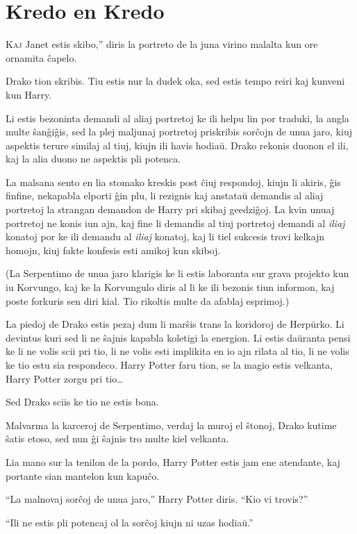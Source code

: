 \chapter{Kredo en Kredo}

\lettrine[ante=“]{K}{aj} Janet estis skibo,” diris la portreto de la
juna virino malalta kun ore ornamita ĉapelo.

Drako tion skribis. Tiu estis nur la dudek oka, sed estis tempo reiri kaj kunveni kun Harry.

Li estis bezoninta demandi al aliaj portretoj ke ili helpu lin por
traduki, la angla multe ŝanĝiĝis, sed la plej maljunaj portretoj
priskribis sorĉojn de unua jaro, kiuj aspektis terure similaj al tiuj,
kiujn ili havis hodiaŭ. Drako rekonis duonon el ili, kaj la alia duono
ne aspektis pli potenca.

La malsana sento en lia stomako kreskis post ĉiuj respondoj, kiujn li
akiris, ĝis finfine, nekapabla elporti ĝin plu, li rezignis kaj
anstataŭ demandis al aliaj portretoj la strangan demandon de Harry pri
skibaj geedziĝoj. La kvin unuaj portretoj ne konis iun ajn, kaj fine
li demandis al tiuj portretoj demandi al \emph{iliaj} konatoj por ke
ili demandu al \emph{iliaj} konatoj, kaj li tiel sukcesis trovi
kelkajn homojn, kiuj fakte konfesis esti amikoj kun skiboj.

(La Serpentimo de unua jaro klarigis ke li estis laboranta sur grava
projekto kun iu Korvungo, kaj ke la Korvungulo diris al li ke ili
bezonis tiun informon, kaj poste forkuris sen diri kial. Tio rikoltis
multe da afablaj esprimoj.)

La piedoj de Drako estis pezaj dum li marŝis trans la koridoroj de
Herpŭrko. Li devintus kuri sed li ne ŝajnis kapabla koletigi la
energion. Li estis daŭranta pensi ke li ne volis scii pri tio, li ne
volis esti implikita en io ajn rilata al tio, li ne volis ke tio estu
sia respondeco. Harry Potter faru tion, se la magio estis velkanta,
Harry Potter zorgu pri tio\ldots

Sed Drako sciis ke tio ne estis bona.

Malvarma la karceroj de Serpentimo, verdaj la muroj el ŝtonoj, Drako kutime ŝatis etoso, sed nun ĝi ŝajnis tro multe kiel velkanta.

Lia mano sur la tenilon de la pordo, Harry Potter estis jam ene atendante, kaj portante sian mantelon kun kapuĉo.

``La malnovaj sorĉoj de unua jaro,'' Harry Potter diris. ``Kio vi trovis?''

``Ili ne estis pli potencaj ol la sorĉoj kiujn ni uzas hodiaŭ.''

